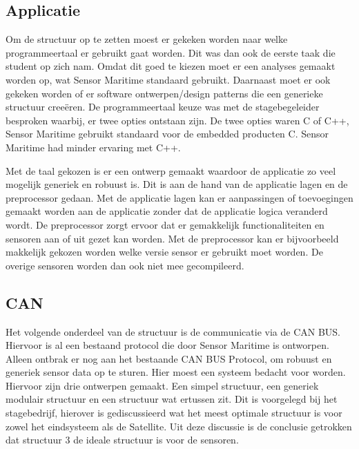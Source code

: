 \subsection{Applicatie}
Om de structuur op te zetten moest er gekeken worden naar welke programmeertaal er gebruikt gaat worden. Dit was dan ook de eerste taak die student op zich nam. Omdat dit goed te kiezen moet er een analyses gemaakt worden op, wat Sensor Maritime standaard gebruikt. Daarnaast moet er ook gekeken worden of er software ontwerpen/design patterns die een generieke structuur creeëren. De programmeertaal keuze was met de stagebegeleider besproken waarbij, er twee opties ontstaan zijn. De twee opties waren C of C++, Sensor Maritime gebruikt standaard voor de embedded producten C. Sensor Maritime had minder ervaring met C++. \newline

\noindent Met de taal gekozen is er een ontwerp gemaakt waardoor de applicatie zo veel mogelijk generiek en robuust is. Dit is aan de hand van de applicatie lagen en de preprocessor gedaan. Met de applicatie lagen kan er aanpassingen of toevoegingen gemaakt worden aan de applicatie zonder dat de applicatie logica veranderd wordt. De preprocessor zorgt ervoor dat er gemakkelijk functionaliteiten en sensoren aan of uit gezet kan worden. Met de preprocessor kan er bijvoorbeeld makkelijk gekozen worden welke versie sensor er gebruikt moet worden. De overige sensoren worden dan ook niet mee gecompileerd.

\subsection{CAN}
Het volgende onderdeel van de structuur is de communicatie via de CAN BUS. Hiervoor is al een bestaand protocol die door Sensor Maritime is ontworpen. Alleen ontbrak er nog aan het bestaande CAN BUS Protocol, om robuust en generiek sensor data op te sturen. Hier moest een systeem bedacht voor worden. Hiervoor zijn drie ontwerpen gemaakt. Een simpel structuur, een generiek modulair structuur en een structuur wat ertussen zit. Dit is voorgelegd bij het stagebedrijf, hierover is gediscussieerd wat het meest optimale structuur is voor zowel het eindsysteem als de Satellite. Uit deze discussie is de conclusie getrokken dat structuur 3 de ideale structuur is voor de sensoren.

